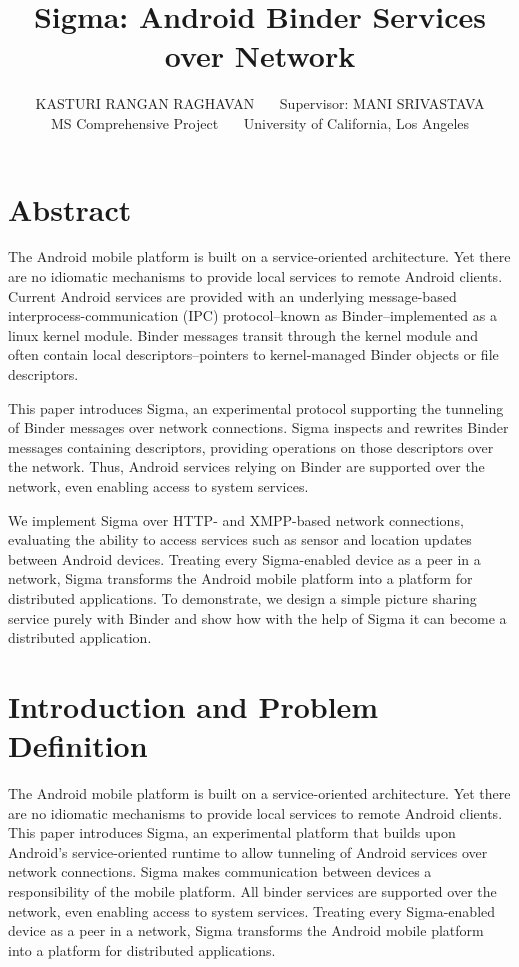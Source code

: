 \documentclass[prodmode]{acmlarge}
\title{Sigma: Android Binder Services over Network}
\author{KASTURI RANGAN RAGHAVAN~~~
Supervisor: MANI SRIVASTAVA\\
MS Comprehensive Project~~~
University of California, Los Angeles
}
\begin{document}
\pagestyle{plain}
\maketitle
\tableofcontents

\clearpage

\section{Abstract}
The Android mobile platform is built on a service-oriented architecture. Yet there are no idiomatic mechanisms to provide local services to remote Android clients. Current Android services are provided with an underlying message-based interprocess-communication (IPC) protocol--known as Binder--implemented as a linux kernel module. Binder messages transit through the kernel module and often contain local descriptors--pointers to kernel-managed Binder objects or file descriptors.

This paper introduces Sigma, an experimental protocol supporting the tunneling of Binder messages over network connections. Sigma inspects and rewrites Binder messages containing descriptors, providing operations on those descriptors over the network. Thus, Android services relying on Binder are supported over the network, even enabling access to system services.

We implement Sigma over HTTP- and XMPP-based network connections, evaluating the ability to access services such as sensor and location updates between Android devices. Treating every Sigma-enabled device as a peer in a network, Sigma transforms the Android mobile platform into a platform for distributed applications. To demonstrate, we design a simple picture sharing service purely with Binder and show how with the help of Sigma it can become a distributed application.

\section{Introduction and Problem Definition}

The Android mobile platform is built on a service-oriented architecture. Yet there are no idiomatic mechanisms to provide local services to remote Android clients. This paper introduces Sigma, an experimental platform that builds upon Android's service-oriented runtime to allow tunneling of Android services over network connections. Sigma makes communication between devices a responsibility of the mobile platform. All binder services are supported over the network, even enabling access to system services. Treating every Sigma-enabled device as a peer in a network, Sigma transforms the Android mobile platform into a platform for distributed applications.
\end{document}
